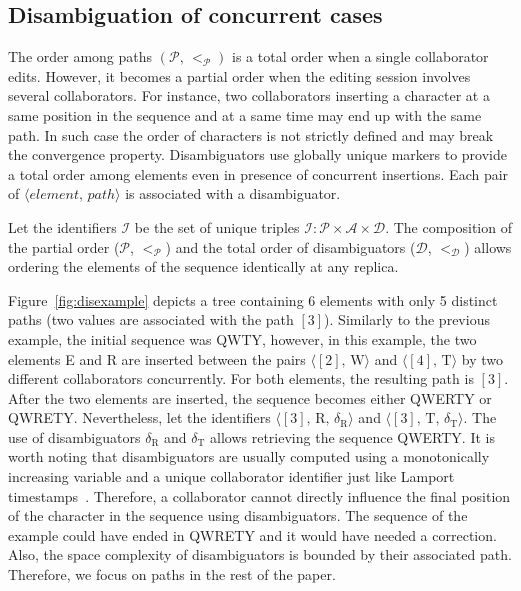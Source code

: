 \subsection{Disambiguation of concurrent cases}
\label{subsec:disambiguation}

The order among paths $(\mathcal{P},\,<_\mathcal{P})$ is a total order when a
single collaborator edits. However, it becomes a partial order when the editing
session involves several collaborators. For instance, two collaborators
inserting a character at a same position in the sequence and at a same time may
end up with the same path. In such case the order of characters is not strictly
defined and may break the convergence property. Disambiguators use globally
unique markers to provide a total order among elements even in presence of
concurrent insertions. Each pair of $\langle element,\,path\rangle$ is
associated with a disambiguator. 

Let the identifiers $\mathcal{I}$ be the set of unique triples
$\mathcal{I}:\mathcal{P}\times \mathcal{A}\times \mathcal{D}$. The composition
of the partial order ($\mathcal{P}$, $<_{\mathcal{P}}$) and the total order of
disambiguators ($\mathcal{D}$, $<_{\mathcal{D}}$) allows ordering the elements
of the sequence identically at any replica.

Figure~\ref{fig:disexample} depicts a tree containing 6 elements with only 5
distinct paths (two values are associated with the path $[3]$). Similarly to the
previous example, the initial sequence was QWTY, however, in this example, the
two elements E and R are inserted between the pairs
$\langle [2],\, \text{W}\rangle$ and $\langle [4],\, \text{T}\rangle$ by two
different collaborators concurrently. For both elements, the resulting path is
$[3]$. After the two elements are inserted, the sequence becomes either QWERTY
or QWRETY. Nevertheless, let the identifiers
$\langle [3],\, \text{R},\, \delta_\text{R}\rangle$ and
$\langle [3],\, \text{T},\, \delta_\text{T} \rangle$. The use of disambiguators
$\delta_{\text{R}}$ and $\delta_{\text{T}}$ allows retrieving the sequence
QWERTY. It is worth noting that disambiguators are usually computed using a
monotonically increasing variable and a unique collaborator identifier just like
Lamport timestamps~\cite{lamport1978time}. Therefore, a collaborator cannot
directly influence the final position of the character in the sequence using
disambiguators. The sequence of the example could have ended in QWRETY and it
would have needed a correction. Also, the space complexity of disambiguators is
bounded by their associated path. Therefore, we focus on paths in the rest of
the paper.

